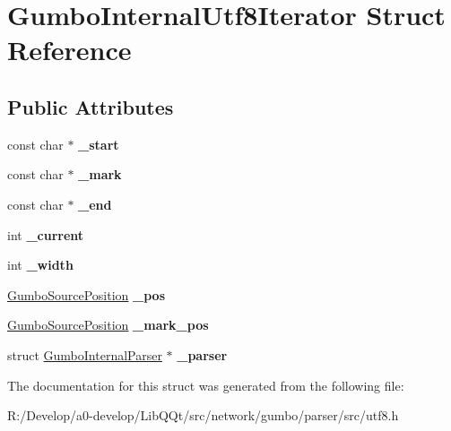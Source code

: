 \hypertarget{struct_gumbo_internal_utf8_iterator}{}\section{Gumbo\+Internal\+Utf8\+Iterator Struct Reference}
\label{struct_gumbo_internal_utf8_iterator}
\subsection*{Public Attributes}
\begin{DoxyCompactItemize}
\item 
\mbox{\label{struct_gumbo_internal_utf8_iterator_a156fd48e443425458b2937d02a0279b0}} 
const char $\ast$ {\bfseries \+\_\+start}
\item 
\mbox{\label{struct_gumbo_internal_utf8_iterator_a6e38086b4f164ebcf827a2e473f96af8}} 
const char $\ast$ {\bfseries \+\_\+mark}
\item 
\mbox{\label{struct_gumbo_internal_utf8_iterator_a09e4fc94a1ce4c5aa68b385c8c08e494}} 
const char $\ast$ {\bfseries \+\_\+end}
\item 
\mbox{\label{struct_gumbo_internal_utf8_iterator_a81108d6fd94cdd1a3b39d38c69a32966}} 
int {\bfseries \+\_\+current}
\item 
\mbox{\label{struct_gumbo_internal_utf8_iterator_a865b9f12ef2b961fc01a2fa4dba759b5}} 
int {\bfseries \+\_\+width}
\item 
\mbox{\label{struct_gumbo_internal_utf8_iterator_a78a4e4794393d6e849941cc41d85e7d6}} 
\mbox{\hyperlink{struct_gumbo_source_position}{Gumbo\+Source\+Position}} {\bfseries \+\_\+pos}
\item 
\mbox{\label{struct_gumbo_internal_utf8_iterator_aadfabc67c5befaa1e1c7a99ddb81b2c1}} 
\mbox{\hyperlink{struct_gumbo_source_position}{Gumbo\+Source\+Position}} {\bfseries \+\_\+mark\+\_\+pos}
\item 
\mbox{\label{struct_gumbo_internal_utf8_iterator_ad07c3d7c983623fb86df822e2d021d63}} 
struct \mbox{\hyperlink{struct_gumbo_internal_parser}{Gumbo\+Internal\+Parser}} $\ast$ {\bfseries \+\_\+parser}
\end{DoxyCompactItemize}


The documentation for this struct was generated from the following file\+:\begin{DoxyCompactItemize}
\item 
R\+:/\+Develop/a0-\/develop/\+Lib\+Q\+Qt/src/network/gumbo/parser/src/utf8.\+h\end{DoxyCompactItemize}
